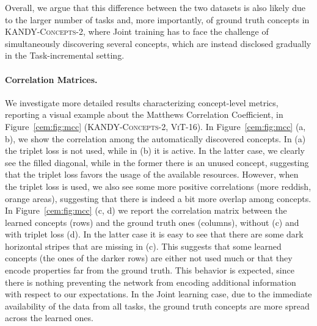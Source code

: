 %
Overall, we argue that this difference between the two datasets is also likely due to the larger number of tasks and, more importantly, of ground truth concepts in \textsc{KANDY-Concepts-2}, where Joint training has to face the challenge of simultaneously discovering several concepts, which are instead disclosed gradually in the Task-incremental setting. %

\paragraph{Correlation Matrices.} We investigate more detailed results characterizing concept-level metrics, reporting a visual example about the Matthews Correlation Coefficient, in Figure~\ref{cem:fig:mcc} (\textsc{KANDY-Concepts-2}, \textsc{ViT-16}). In Figure~\ref{cem:fig:mcc} (a, b), we show the correlation among the automatically discovered concepts. In (a) the triplet loss is not used, while in (b) it is active. In the latter case, we clearly see the filled diagonal, while in the former there is an unused concept, suggesting that the triplet loss favors the usage of the available resources. However, when the triplet loss is used, we also see some more positive correlations (more reddish, orange areas), suggesting that there is indeed a bit more overlap among concepts. In Figure~\ref{cem:fig:mcc} (c, d) we report the correlation matrix between the learned concepts (rows) and the ground truth ones (columns), without (c) and with triplet loss (d). In the latter case it is easy to see that there are some dark horizontal stripes that are missing in (c). This suggests that some learned concepts (the ones of the darker rows) are either not used much or that they encode properties far from the ground truth. This behavior is expected, since there is nothing preventing the network from encoding additional information with respect to our expectations. In the Joint learning case, due to the immediate availability of the data from all tasks, the ground truth concepts are more spread across the learned ones.

